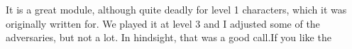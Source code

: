 It is a great module, although quite deadly for level 1 characters, which it was originally written for. We played it at level 3 and I adjusted some of the adversaries, but not a lot. In hindsight, that was a good call.If you like the 